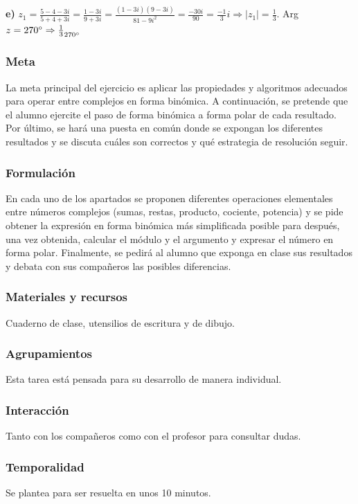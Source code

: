 \documentclass[../main.tex]{memoir}
\begin{document}
\textbf{e)} $z_1 = \frac{5-4-3i}{5+4+3i} = \frac{1-3i}{9+3i} = \frac{(1-3i)(9-3i)}{81-9i^2} = \frac{-30i}{90} = \frac{-1}{3}i \Rightarrow |z_1| = \frac{1}{3}.$ Arg $z = 270\degree \Rightarrow \frac{1}{3}_{270\degree}$




\subsubsection{Meta}
La meta principal del ejercicio es aplicar las propiedades y algoritmos adecuados para operar entre complejos en forma binómica. A continuación, se pretende que el alumno ejercite el paso de forma binómica a forma polar de cada resultado. Por último, se hará una puesta en común donde se expongan los diferentes resultados y se discuta cuáles son correctos y qué estrategia de resolución seguir.

\subsubsection{Formulación}
En cada uno de los apartados se proponen diferentes operaciones elementales entre números complejos (sumas, restas, producto, cociente, potencia) y se pide obtener la expresión en forma binómica más simplificada posible para después, una vez obtenida, calcular el módulo y el argumento y expresar el número en forma polar. Finalmente, se pedirá al alumno que exponga en clase sus resultados y debata con sus compañeros las posibles diferencias.

\subsubsection{Materiales y recursos}
Cuaderno de clase, utensilios de escritura y de dibujo.

\subsubsection{Agrupamientos}
Esta tarea está pensada para su desarrollo de manera individual.


\subsubsection{Interacción}
Tanto con los compañeros como con el profesor para consultar dudas.


\subsubsection{Temporalidad}
Se plantea para ser resuelta en unos 10 minutos.
\end{document}
